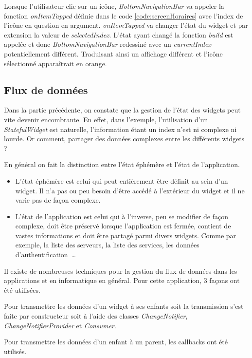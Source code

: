 Lorsque l'utilisateur clic sur un icône, \textit{BottomNavigationBar} va appeler la fonction \textit{onItemTapped} définie dans le code \autoref{code:screenHoraires} avec
l'index de l'icône en question en argument. \textit{onItemTapped} va changer l'état du widget et par extension la valeur de \textit{selectedIndex}. L'état ayant changé la fonction
\textit{build} est appelée et donc \textit{BottomNavigationBar} redessiné avec un \textit{currentIndex} potentiellement différent. Traduisant ainsi
un affichage différent et l'icône sélectionné apparaîtrait en orange.

\subsection{Flux de données}
Dans la partie précédente, on constate que la gestion de l'état des widgets peut vite devenir encombrante. En effet, dans l'exemple,
l'utilisation d'un \textit{StatefulWidget} est naturelle, l'information étant un index n'est ni complexe ni lourde. Or comment, partager des
données complexes entre les différents widgets ?

En général on fait la distinction entre l'état éphémère et l'état de l'application.
\smallskip
\begin{itemize}
    \item L'état éphémère est celui qui peut entièrement être définit au sein d'un widget. Il n'a pas ou peu besoin d'être
          accédé à l'extérieur du widget et il ne varie pas de façon complexe.
    \item L'état de l'application est celui qui à l'inverse, peu se modifier de façon complexe, doit être préservé lorsque l'application est fermée,
          contient de vastes informations et doit être partagé parmi divers widgets. Comme par exemple, la liste des serveurs, la liste des services, les
          données d'authentification~\dots
\end{itemize}

Il existe de nombreuses techniques pour la gestion du flux de données dans les applications et en informatique en général. Pour cette application, 3 façons
ont été utilisées.

Pour transmettre les données d'un widget à ses enfants soit la transmission s'est faite par constructeur soit à l'aide des classes \textit{ChangeNotifier}, \textit{ChangeNotifierProvider} et \textit{Consumer}.

Pour transmettre les données d'un enfant à un parent, les callbacks ont été utilisés.

